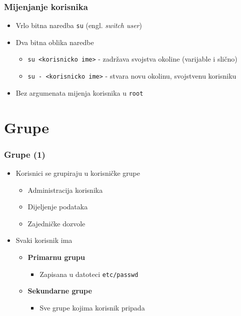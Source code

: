 \documentclass[table,usenames,dvipsnames] {beamer}
\newcommand{\shell}[1]{\texttt{#1}}
\begin{document}
\begin{frame}[t]
\frametitle{Mijenjanje korisnika} 
\begin{itemize}
  \item Vrlo bitna naredba \shell{su} (engl. \emph{switch user})
  \item Dva bitna oblika naredbe
  \begin{itemize}
    \item \shell{su <korisnicko ime>} - zadržava svojstva okoline (varijable i slično)
    \item \shell{su - <korisnicko ime>} - stvara novu okolinu, svojstvenu korisniku
  \end{itemize}
  \item Bez argumenata mijenja korisnika u \shell{root}
\end{itemize}
\end{frame}

\section{Grupe}
\begin{frame}[t]
\frametitle{Grupe (1)}
\begin{itemize}
  \item Korisnici se grupiraju u korisničke grupe
  \begin{itemize}
  	\item Administracija korisnika
  	\item Dijeljenje podataka
  	\item Zajedničke dozvole
  \end{itemize}
  \item Svaki korisnik ima
  \begin{itemize}
    \item[] \textbf{Primarnu grupu}
    \begin{itemize}
      \item Zapisana u datoteci \shell{etc/passwd} 
    \end{itemize}
    \item[] \textbf{Sekundarne grupe}
    \begin{itemize}
      \item  Sve grupe kojima korisnik pripada
    \end{itemize}
  \end{itemize}
\end{itemize}
\end{frame}
\end{document}
